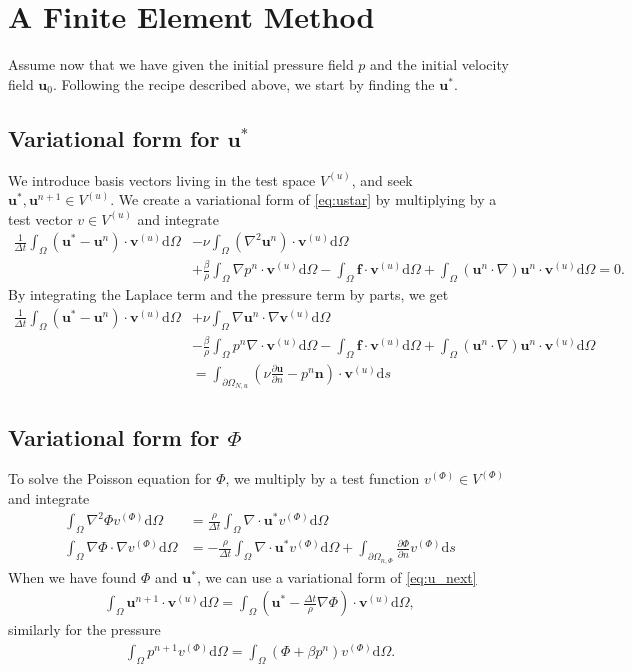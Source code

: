 \documentclass[a4paper,10pt]{article}
\renewcommand{\vec}[1]{\mathbf{#1}}
\renewcommand{\(}{\left(}
\renewcommand{\)}{\right)}
\newcommand{\dm}[1]{\text{d}#1}
\newcommand{\dpart}[2]{\frac{\partial#1}{\partial#2}}
\begin{document}
\section{A Finite Element Method}
Assume now that we have given the initial pressure field $p$ and the initial velocity field $\vec u_0$. Following the recipe described above, we start by finding the $\vec u^*$. 
\subsection{Variational form for $\vec u^*$}
We introduce basis vectors living in the test space $V^{(u)}$, and seek $\vec u^*, \vec u^{n+1} \in V^{(u)}$. We create a variational form of \eqref{eq:ustar} by multiplying by a test vector $v\in V^{(u)}$ and integrate
\begin{align*}
  \frac{1}{\Delta t}\int_\Omega(\vec u^* - \vec u^{n})\cdot\vec v^{(u)}\dm \Omega
  &- \nu\int_\Omega (\nabla^2\vec u^n)\cdot\vec v^{(u)} \dm \Omega\\
   &+ \frac{\beta}{\rho}\int_\Omega\nabla p^n \cdot\vec v^{(u)} \dm \Omega 
   - \int_\Omega\vec f\cdot\vec v^{(u)} \dm \Omega 
   + \int_\Omega(\vec u^n\cdot \nabla)\vec u^n\cdot\vec v^{(u)} \dm \Omega = 0.
\end{align*}
By integrating the Laplace term and the pressure term by parts, we get
\begin{align*}
  \frac{1}{\Delta t}\int_\Omega(\vec u^* - \vec u^{n})\cdot\vec v^{(u)}\dm \Omega
  &+ \nu\int_\Omega\nabla\vec u^n\cdot\nabla\vec v^{(u)} \dm \Omega\\
   &- \frac{\beta}{\rho}\int_\Omega p^n \nabla\cdot\vec v^{(u)} \dm \Omega 
   - \int_\Omega\vec f\cdot\vec v^{(u)} \dm \Omega 
   + \int_\Omega (\vec u^n\cdot \nabla)\vec u^n\cdot\vec v^{(u)} \dm \Omega\\
   &= \int_{\partial\Omega_{N,u}} (\nu\dpart{\vec u}{n} - p^n\vec n)\cdot\vec v^{(u)} \dm s
\end{align*}
\subsection{Variational form for $\Phi$}
To solve the Poisson equation for $\Phi$, we multiply by a test function $v^{(\Phi)} \in V^{(\Phi)}$ and integrate
\begin{align*}
  \int_\Omega \nabla^2\Phi v^{(\Phi)} \dm \Omega &= \frac{\rho}{\Delta t} \int_\Omega \nabla \cdot \vec u^* v^{(\Phi)} \dm \Omega\\
  \int_\Omega \nabla\Phi \cdot \nabla v^{(\Phi)} \dm \Omega &= -\frac{\rho}{\Delta t} \int_\Omega \nabla \cdot \vec u^* v^{(\Phi)} \dm \Omega + \int_{\partial \Omega_{n,\Phi}} \dpart{\Phi}{n}v^{(\Phi)} \dm s
\end{align*}
When we have found $\Phi$ and $\vec u^*$, we can use a variational form of \eqref{eq:u_next}
\begin{align*}
  \int_\Omega \vec u^{n+1}\cdot \vec v^{(u)} \dm \Omega = \int_\Omega (\vec u^* - \frac{\Delta t}{\rho}\nabla \Phi)\cdot \vec v^{(u)} \dm \Omega,
\end{align*}
similarly for the pressure
\begin{align*}
  \int_\Omega p^{n+1}v^{(\Phi)} \dm \Omega = \int_\Omega (\Phi + \beta p^n)v^{(\Phi)} \dm \Omega.
\end{align*}
\end{document}
